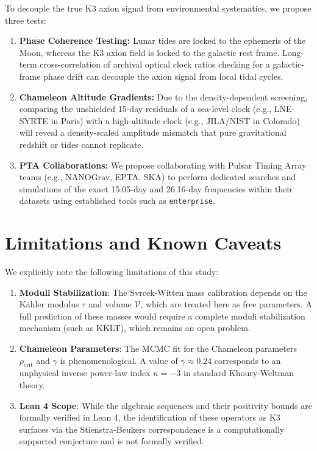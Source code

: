 \documentclass[11pt,a4paper]{article}
\begin{document}
To decouple the true K3 axion signal from environmental systematics, we propose three tests:
\begin{enumerate}
    \item \textbf{Phase Coherence Testing:} Lunar tides are locked to the ephemeris of the Moon, whereas the K3 axion field is locked to the galactic rest frame. Long-term cross-correlation of archival optical clock ratios checking for a galactic-frame phase drift can decouple the axion signal from local tidal cycles.
    \item \textbf{Chameleon Altitude Gradients:} Due to the density-dependent screening, comparing the unshielded 15-day residuals of a sea-level clock (e.g., LNE-SYRTE in Paris) with a high-altitude clock (e.g., JILA/NIST in Colorado) will reveal a density-scaled amplitude mismatch that pure gravitational redshift or tides cannot replicate.
    \item \textbf{PTA Collaborations:} We propose collaborating with Pulsar Timing Array teams (e.g., NANOGrav, EPTA, SKA) to perform dedicated searches and simulations of the exact 15.05-day and 26.16-day frequencies within their datasets using established tools such as \texttt{enterprise}.
\end{enumerate}

\section{Limitations and Known Caveats}
We explicitly note the following limitations of this study:
\begin{enumerate}
    \item \textbf{Moduli Stabilization}: The Svrcek-Witten mass calibration depends on the Kähler modulus $\tau$ and volume $\mathcal{V}$, which are treated here as free parameters. A full prediction of these masses would require a complete moduli stabilization mechanism (such as KKLT), which remains an open problem.
    \item \textbf{Chameleon Parameters}: The MCMC fit for the Chameleon parameters $\rho_{\text{crit}}$ and $\gamma$ is phenomenological. A value of $\gamma \approx 0.24$ corresponds to an unphysical inverse power-law index $n = -3$ in standard Khoury-Weltman theory.
    \item \textbf{Lean 4 Scope}: While the algebraic sequences and their positivity bounds are formally verified in Lean 4, the identification of these operators as K3 surfaces via the Stienstra-Beukers correspondence is a computationally supported conjecture and is not formally verified.
\end{enumerate}
\end{document}

